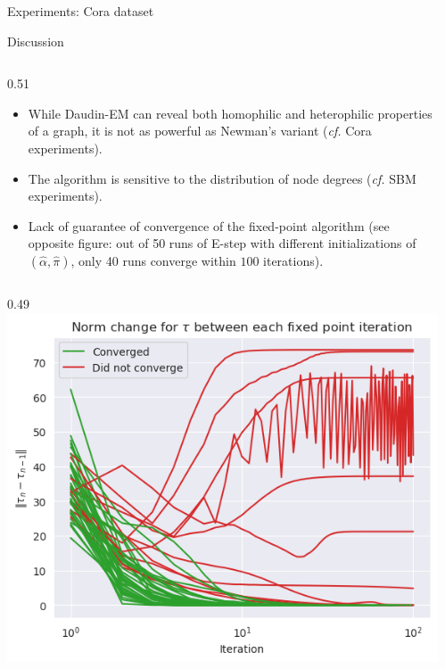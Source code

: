 \documentclass[final]{beamer}
\newlength{\sepwidth}
\newlength{\colwidth}
\newcommand{\separatorcolumn}{\begin{column}{\sepwidth}\end{column}}
\begin{document}
\begin{frame}[t]
\begin{columns}[t]
\begin{column}{\colwidth}
\begin{block}{Experiments: Cora dataset}
      \end{block}

      \begin{exampleblock}{Discussion}
        \begin{column}{0.51\colwidth}
          \justifying
          \begin{itemize}
            \item While Daudin-EM \cite{main_article} can reveal both homophilic and heterophilic properties of a graph, it is not as powerful as Newman's variant (\textit{cf.} Cora experiments).
            \item The algorithm is sensitive to the distribution of node degrees (\textit{cf.} SBM experiments).
            \item Lack of guarantee of convergence of the fixed-point algorithm (see opposite figure: out of 50 runs of E-step with different initializations of $(\hat{\alpha}, \hat{\pi})$, only 40 runs converge within $100$ iterations).
          \end{itemize}
          \vspace{1em}
        \end{column}
        \begin{column}{0.49\colwidth}
          \centering\\
          \includegraphics[width=0.8\linewidth]{figures/fixed-point-convergence.png}
        \end{column}
      \end{exampleblock}

    \end{column}
    \separatorcolumn



  \end{columns}
\end{frame}
\end{document}
